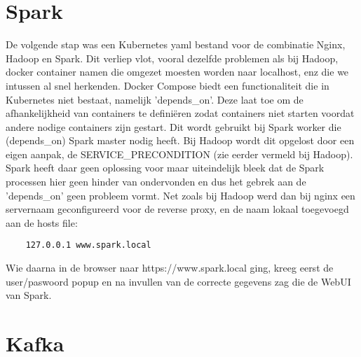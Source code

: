 \section{Spark}

De volgende stap was een Kubernetes yaml bestand voor de combinatie Nginx, Hadoop en Spark. Dit verliep vlot, vooral dezelfde problemen als bij Hadoop, docker container namen die omgezet moesten worden naar localhost, enz die we intussen al snel herkenden.
\newline
\newline
Docker Compose biedt een functionaliteit die in Kubernetes niet bestaat, namelijk 'depends\_on'. Deze laat toe om de afhankelijkheid van containers te definiëren zodat containers niet starten voordat andere nodige containers zijn gestart. Dit wordt gebruikt bij Spark worker die (depends\_on) Spark master nodig heeft.
Bij Hadoop wordt dit opgelost door een eigen aanpak, de SERVICE\_PRECONDITION (zie eerder vermeld bij Hadoop).
\newline
\newline
Spark heeft daar geen oplossing voor maar uiteindelijk bleek dat de Spark processen hier geen hinder van ondervonden en dus het gebrek aan de 'depends\_on' geen probleem vormt.
\newline
\newline
Net zoals bij Hadoop werd dan bij nginx een servernaam geconfigureerd voor de reverse proxy, en de naam lokaal toegevoegd aan de hosts file:
\begin{lstlisting}
    127.0.0.1 www.spark.local
\end{lstlisting}

Wie daarna in de browser naar https://www.spark.local ging, kreeg eerst de user/paswoord popup en na invullen van de correcte gegevens zag die de WebUI van Spark.

\section{Kafka}


